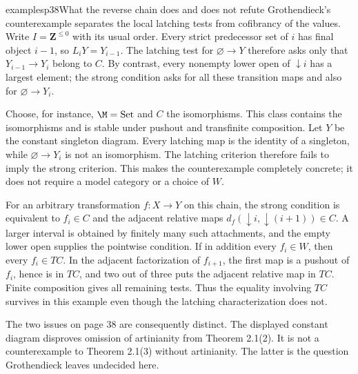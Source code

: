 \begin{dcomment}{examples}{p38}{What the reverse chain does and does not refute}
Grothendieck's counterexample separates the local latching tests from cofibrancy of the values. Write $I=\mathbf Z^{\leq0}$ with its usual order. Every strict predecessor set of $i$ has final object $i-1$, so $L_iY=Y_{i-1}$. The latching test for $\varnothing\to Y$ therefore asks only that $Y_{i-1}\to Y_i$ belong to $C$. By contrast, every nonempty lower open of $\downarrow i$ has a largest element; the strong condition asks for all these transition maps and also for $\varnothing\to Y_i$.

Choose, for instance, $\M=\mathrm{Set}$ and $C$ the isomorphisms. This class contains the isomorphisms and is stable under pushout and transfinite composition. Let $Y$ be the constant singleton diagram. Every latching map is the identity of a singleton, while $\varnothing\to Y_i$ is not an isomorphism. The latching criterion therefore fails to imply the strong criterion. This makes the counterexample completely concrete; it does not require a model category or a choice of $W$.

For an arbitrary transformation $f:X\to Y$ on this chain, the strong condition is equivalent to $f_i\in C$ and the adjacent relative maps $d_f(\downarrow i,\downarrow(i+1))\in C$. A larger interval is obtained by finitely many such attachments, and the empty lower open supplies the pointwise condition. If in addition every $f_i\in W$, then every $f_i\in TC$. In the adjacent factorization of $f_{i+1}$, the first map is a pushout of $f_i$, hence is in $TC$, and two out of three puts the adjacent relative map in $TC$. Finite composition gives all remaining tests. Thus the equality involving $TC$ survives in this example even though the latching characterization does not.

The two issues on page 38 are consequently distinct. The displayed constant diagram disproves omission of artinianity from Theorem 2.1(2). It is not a counterexample to Theorem 2.1(3) without artinianity. The latter is the question Grothendieck leaves undecided here.
\end{dcomment}

